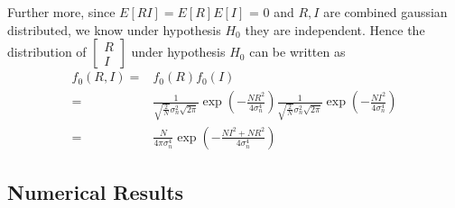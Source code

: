 Further more, since $E[RI] = E[R]E[I]$ = 0 and $R, I$ are combined gaussian distributed,  we know under hypothesis $H_0$ they are independent. Hence the distribution of $\begin{bmatrix}
  R \\
  I
\end{bmatrix}$ under hypothesis $H_0$ can be written as
\begin{equation}
  \begin{split}
	f_0(R, I)= &f_0(R)f_0(I)\\
	= &\frac{1}{\sqrt{\frac{2}{N}}\sigma_n^2\sqrt{2\pi}}\exp\left( -\frac{NR^2}{4\sigma_n^4} \right)\frac{1}{\sqrt{\frac{2}{N}}\sigma_n^2\sqrt{2\pi}}\exp\left( -\frac{NI^2}{4\sigma_n^4} \right)\\
	=&\frac{N}{4\pi \sigma_n^4}\exp\left( -\frac{NI^2+NR^2}{4\sigma_n^4} \right) 
  \end{split}
  \label{f0R0}
\end{equation}
\subsection{Numerical Results}

